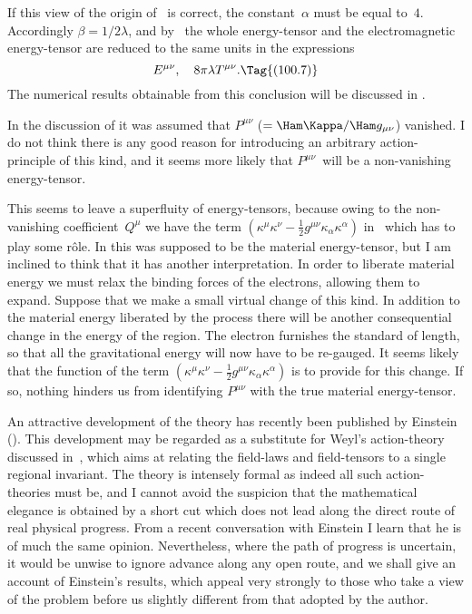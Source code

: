 \documentclass[12pt]{book}
\begin{document}
If this view of the origin of~ is correct, the constant~$\alpha$ must be
equal to~$4$. Accordingly $\beta = 1/2\lambda$, and by~ the whole energy\hyp{}tensor
and the electromagnetic energy\hyp{}tensor are reduced to the same units in the
expressions
\[
E^{\mu\nu},\quad
8\pi\lambda T^{\mu\nu}.
\Tag{(100.7)}
\]
The numerical results obtainable from this conclusion will be discussed in
.

In the discussion of  it was assumed that $P^{\mu\nu}$ ($= \Ham\Kappa/\Ham g_{\mu\nu}$) vanished.
I do not think there is any good reason for introducing an arbitrary action\hyp{}principle
of this kind, and it seems more likely that $P^{\mu\nu}$~will be a non\hyp{}vanishing
energy\hyp{}tensor.

This seems to leave a superfluity of energy\hyp{}tensors, because owing to the
non\hyp{}vanishing coefficient~$Q^{\mu}$ we have the term $(\kappa^{\mu} \kappa^{\nu} - \frac{1}{2} g^{\mu\nu} \kappa_{\alpha} \kappa^{\alpha})$ in~
which has to play some rôle. In  this was supposed to be the material
energy\hyp{}tensor, but I am inclined to think that it has another interpretation.
In order to liberate material energy we must relax the binding forces of the
electrons, allowing them to expand. Suppose that we make a small virtual
change of this kind. In addition to the material energy liberated by the
process there will be another consequential change in the energy of the
region. The electron furnishes the standard of length, so that all the gravitational
energy will now have to be re\hyp{}gauged. It seems likely that the
function of the term $(\kappa^{\mu} \kappa^{\nu} - \frac{1}{2} g^{\mu\nu} \kappa_{\alpha} \kappa^{\alpha})$ is to provide for this change. If so,
nothing hinders us from identifying $P^{\mu\nu}$ with the true material energy\hyp{}tensor.

An attractive development of the theory has recently been published by Einstein
().
 This development may be regarded as a substitute for Weyl's action\hyp{}theory
discussed in~, which aims at relating the field-laws and field\hyp{}tensors to a single regional invariant.
The theory is intensely formal as indeed all such action\hyp{}theories must be, and I cannot avoid the suspicion
that the mathematical elegance is obtained by a short cut which does not lead along the direct route of real physical
progress.
From a recent conversation with Einstein I learn that he is of much the same opinion.
Nevertheless, where the path of progress is uncertain, it would be unwise to ignore advance along any open route,
and we shall give an account of Einstein's results, which appeal very strongly to those who take a view of the
problem before us slightly different from that adopted by the author.
\end{document}
